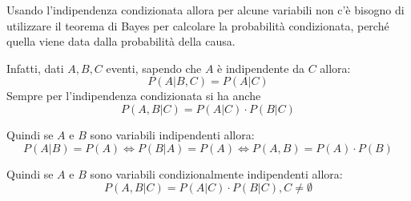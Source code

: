 Usando l'indipendenza condizionata allora per alcune variabili non c'è bisogno di 
utilizzare il teorema di Bayes per calcolare la probabilità condizionata, perché
quella viene data dalla probabilità della causa.

Infatti, dati $A,B,C$ eventi, sapendo che $A$ è indipendente da $C$ allora:
$$P(A|B,C) = P(A|C)$$
Sempre per l'indipendenza condizionata si ha anche
$$P(A,B|C) = P(A|C) \cdot P(B|C)$$

\begin{nota}
    Quindi se $A$ e $B$ sono variabili indipendenti allora:
    $$P(A|B) = P(A) \iff P(B|A) = P(A) \iff P(A,B) = P(A)\cdot P(B)$$
\end{nota}

\begin{nota}
    Quindi se $A$ e $B$ sono variabili condizionalmente indipendenti allora:
    $$P(A,B|C) = P(A|C)\cdot P(B|C), C\ne \emptyset$$
\end{nota}